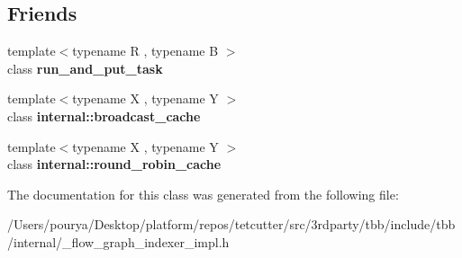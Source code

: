 \subsection*{Friends}
\begin{DoxyCompactItemize}
\item 
\hypertarget{classinternal_1_1indexer__input__port_abaf9bf74ca5f2854d09f5f07337280eb}{}{\footnotesize template$<$typename R , typename B $>$ }\\class {\bfseries run\+\_\+and\+\_\+put\+\_\+task}\label{classinternal_1_1indexer__input__port_abaf9bf74ca5f2854d09f5f07337280eb}

\item 
\hypertarget{classinternal_1_1indexer__input__port_a1360e38efe396058978cf3754ad620f5}{}{\footnotesize template$<$typename X , typename Y $>$ }\\class {\bfseries internal\+::broadcast\+\_\+cache}\label{classinternal_1_1indexer__input__port_a1360e38efe396058978cf3754ad620f5}

\item 
\hypertarget{classinternal_1_1indexer__input__port_acbd9ac2610587a99cd7d43344297cc49}{}{\footnotesize template$<$typename X , typename Y $>$ }\\class {\bfseries internal\+::round\+\_\+robin\+\_\+cache}\label{classinternal_1_1indexer__input__port_acbd9ac2610587a99cd7d43344297cc49}

\end{DoxyCompactItemize}


The documentation for this class was generated from the following file\+:\begin{DoxyCompactItemize}
\item 
/\+Users/pourya/\+Desktop/platform/repos/tetcutter/src/3rdparty/tbb/include/tbb/internal/\+\_\+flow\+\_\+graph\+\_\+indexer\+\_\+impl.\+h\end{DoxyCompactItemize}
